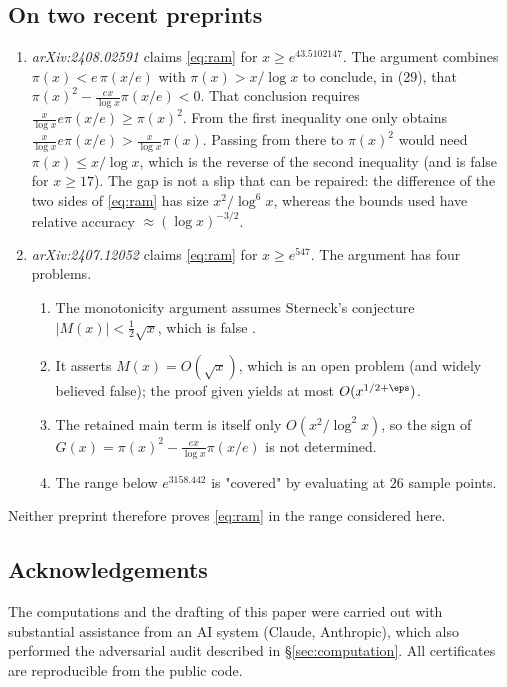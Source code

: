 \subsection{On two recent preprints}\label{sec:de}
\begin{enumerate}
\item \emph{arXiv:2408.02591} \cite{De2} claims \eqref{eq:ram} for $x \ge e^{43.5102147}$.
  The argument combines $\pi(x) < e\,\pi(x/e)$ with $\pi(x) > x/\log x$ to conclude, in (29), that $\pi(x)^2 - \frac{ex}{\log x}\pi(x/e) < 0$.
  That conclusion requires $\frac{x}{\log x}e\pi(x/e) \ge \pi(x)^2$.
  From the first inequality one only obtains $\frac{x}{\log x}e\pi(x/e) > \frac{x}{\log x}\pi(x)$.
  Passing from there to $\pi(x)^2$ would need $\pi(x) \le x/\log x$, which is the reverse of the second inequality (and is false for $x \ge 17$).
  The gap is not a slip that can be repaired: the difference of the two sides of \eqref{eq:ram} has size $x^2/\log^6x$, whereas the bounds used have relative accuracy $\approx(\log x)^{-3/2}$.
\item \emph{arXiv:2407.12052} \cite{De1} claims \eqref{eq:ram} for $x\ge e^{547}$.
  The argument has four problems.
  \begin{enumerate}
  \item The monotonicity argument assumes Sterneck's conjecture $|M(x)| < \frac12\sqrt x$, which is false \cite{Neubauer}.
  \item It asserts $M(x) = O(\sqrt x)$, which is an open problem (and widely believed false); the proof given yields at most $O(x^{1/2+\eps})$.
  \item The retained main term is itself only $O(x^2/\log^2x)$, so the sign of $G(x) = \pi(x)^2 - \frac{ex}{\log x}\pi(x/e)$ is not determined.
  \item The range below $e^{3158.442}$ is "covered" by evaluating at $26$ sample points.
  \end{enumerate}
\end{enumerate}
Neither preprint therefore proves \eqref{eq:ram} in the range considered here.

\subsection*{Acknowledgements}
The computations and the drafting of this paper were carried out with substantial assistance from an AI system (Claude, Anthropic), which also performed the adversarial audit described in \S\ref{sec:computation}.
All certificates are reproducible from the public code.
